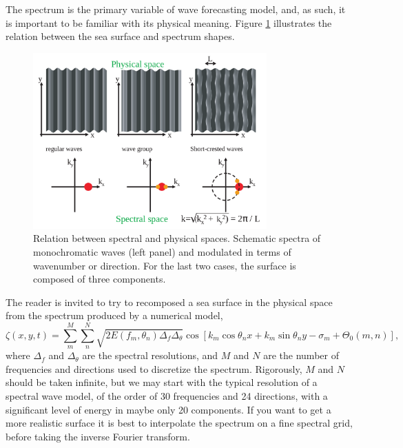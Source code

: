  The spectrum is the primary variable of wave forecasting model, and, as such, it is important to be familiar with its physical meaning. 
 Figure \ref{fig:spectres101}
 illustrates the relation between the sea surface and spectrum shapes.
\begin{figure}[!htbp]
\centerline{\includegraphics[width=0.8\textwidth]{FIGS_CH_MEASUREMENTS/spectres101_en.pdf}}
\caption{Relation between spectral and physical spaces. Schematic spectra of monochromatic waves (left panel) and modulated in terms 
of wavenumber or direction. For the last two cases, the surface is composed of three components.\label{fig:spectres101}}
\end{figure}
The reader is invited to try to recomposed a sea surface in the physical space from the spectrum produced by a numerical model,
\begin{equation}
\zeta(x,y,t)=\sum_{m}^{M}\sum_{n}^{N}\sqrt{2E(f_m,\theta_n)\Delta_f \Delta_\theta} \cos\left[ k_m \cos \theta_n x +k_m \sin \theta_n  y- \sigma_m + \Theta_0(m,n)\right],
\label{eq3.11}
\end{equation}
where $\Delta_f$ and $\Delta_\theta$ are the spectral resolutions, and $M$ and $N$ are the number of frequencies and directions used to discretize the spectrum.  
Rigorously, $M$ and $N$ should be taken infinite, but we may start with the typical resolution of  a 
spectral wave model, of the order of 30 frequencies and 24 directions, with a significant level of energy in maybe only 20 components. If you want to get a more realistic surface it is best to interpolate the spectrum on a fine spectral grid, before taking the inverse Fourier transform. 

